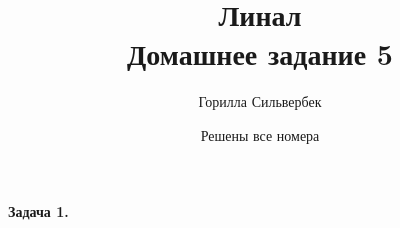 \documentclass[a4paper, 12pt]{article}
\title{ Линал \\
\large Домашнее задание 5}
\date{Решены все номера}
\author{Горилла Сильвербек}
\affil{БПМИ225}
\newcommand{\task}[1] {\noindent \textbf{Задача #1.} \hfill}
\begin{document}
\maketitle
 
\task{1}
 
\end{document}
